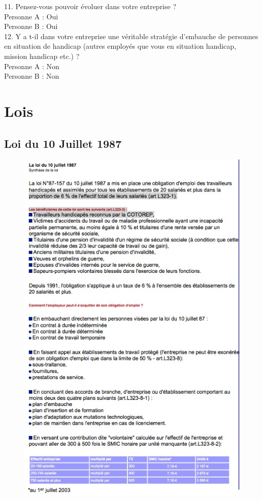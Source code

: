 11. Pensez-vous pouvoir évoluer dans votre entreprise ?\\
Personne A : Oui \\
Personne B : Oui \\


12. Y a t-il dans votre entreprise une véritable stratégie d’embauche de personnes en situation de handicap  (autres employés que vous en situation handicap, mission handicap etc.) ?\\
Personne A : Non \\
Personne B : Non \\



\section{Lois}

\subsection{Loi du 10 Juillet 1987}

\begin{figure}[H]
\includegraphics[scale=0.9]{figures/loi_juillet_1987.jpg}
\centering
\end{figure}

